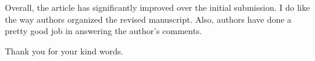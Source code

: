 \begin{reviewer}
Overall, the article has significantly improved over the initial submission. I
do like the way authors organized the revised manuscript. Also, authors have
done a pretty good job in answering the author's comments.
\end{reviewer}

\begin{authors}
Thank you for your kind words.
\end{authors}
